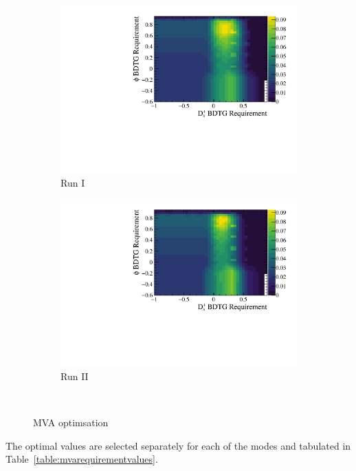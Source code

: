 \begin{figure}[!h]
\begin{subfigure}[t]{0.4\textwidth}
      \includegraphics[width=1.0\textwidth]{figs/Selection/Ds2KPiPi_BDTG_punzi_Run1_cont.pdf}
      \caption{Run I \decay{\Dsp}{\Kp\pim\pip}}
   \end{subfigure}
   \begin{subfigure}[t]{0.4\textwidth}
      \centering
      \includegraphics[width=1.0\textwidth]{figs/Selection/Ds2KPiPi_BDTG_punzi_Run2_cont.pdf}
      \caption{Run II \decay{\Dsp}{\Kp\pim\pip}}
   \end{subfigure}\\
   \caption{MVA optimsation}
   \label{fig:mvaoptmisation}   
\end{figure}

The optimal values are selected separately for each of the modes and tabulated in Table~\ref{table:mvarequirementvalues}.

